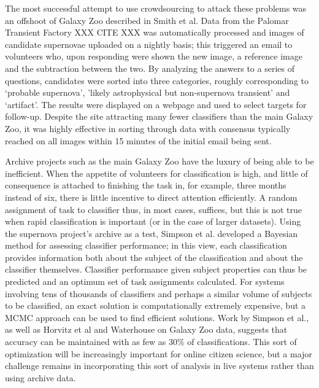 \documentclass{ar2e}
\begin{document}
The most successful attempt to use crowdsourcing to attack these problems was
an offshoot of Galaxy Zoo described in Smith et al. Data from the Palomar
Transient Factory XXX CITE XXX was automatically processed and images of
candidate supernovae uploaded on a nightly basis; this triggered an email to
volunteers who, upon responding were shown the new image, a reference image
and the subtraction between the two. By analyzing the answers to a series of
questions, candidates were sorted into three categories, roughly corresponding
to `probable supernova', 'likely astrophysical but non-supernova transient'
and `artifact'. The results were displayed on a webpage and used to select
targets for follow-up. Despite the site attracting many fewer classifiers than
the main Galaxy Zoo, it was highly effective in sorting through data with
consensus typically reached on all images within 15 minutes of the initial
email being sent. 

Archive projects such as the main Galaxy Zoo have the luxury of being able to
be inefficient. When the appetite of volunteers for classification is high,
and little of consequence is attached to finishing the task in, for example,
three months instead of six, there is little incentive to direct attention
efficiently. A random assignment of task to classifier thus, in most cases,
suffices, but this is not true when rapid classification is important (or in
the case of larger datasets). Using the supernova project's archive as a test,
Simpson et al. developed a Bayesian method for assessing classifier
performance; in this view, each classification provides information both about
the subject of the classification and about the classifier themselves.
Classifier performance given subject properties can thus be predicted and an
optimum set of task assignments calculated. For systems involving tens of
thousands of classifiers and perhaps a similar volume of subjects to be
classified, an exact solution is computationally extremely expensive, but a
MCMC approach can be used to find efficient solutions. Work by Simpson et al.,
as well as Horvitz et al and Waterhouse on Galaxy Zoo data, suggests that
accuracy can be maintained with as few as 30\% of classifications. This sort
of optimization will be increasingly important for online citizen science, but
a major challenge remains in incorporating this sort of analysis in live
systems rather than using archive data. 
\end{document}
